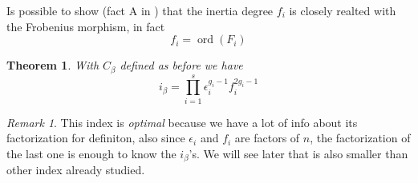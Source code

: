 \documentclass[]{article}
\theoremstyle{plain}
\newtheorem{teo}{Theorem}[section]
\theoremstyle{remark}
\newtheorem{rem}{Remark}
\theoremstyle{definition}
\DeclareMathOperator{\ord}{ord}
\begin{document}
	Is possible to show (fact A in \cite[Page~544]{RIN}) that the inertia degree $ f_i $ is closely realted with the Frobenius morphism, in fact
	\[ f_i = \ord (F_i)\]
	
	\begin{tcolorbox}
		\begin{teo} \label{teo:idx_opt}
			With $ C_\beta $ defined as before we have 
			\[ i_\beta  =  \prod_{i=1}^s \epsilon _i^{g_i - 1} f_i ^{2 g_i - 1}\]
		\end{teo}
	\end{tcolorbox}
	
	\begin{rem}
		This index is \textit{optimal} because we have a lot of info about its factorization for definiton, also since $ \epsilon _i $ and $ f_i $ are factors of $ n $, the factorization of the last one is enough to know the $ i_\beta $'s. We will see later that is also smaller than other index already studied. 
	\end{rem}
	
\end{document}
